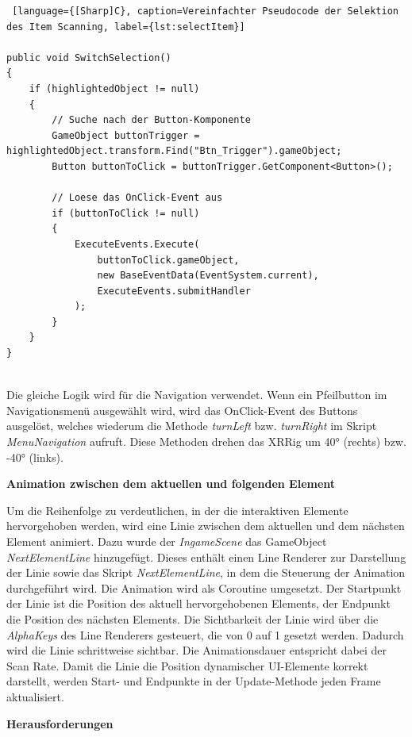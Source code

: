 \begin{lstlisting} [language={[Sharp]C}, caption=Vereinfachter Pseudocode der Selektion des Item Scanning, label={lst:selectItem}]

public void SwitchSelection()
{
    if (highlightedObject != null)
    {
        // Suche nach der Button-Komponente
        GameObject buttonTrigger = highlightedObject.transform.Find("Btn_Trigger").gameObject;
        Button buttonToClick = buttonTrigger.GetComponent<Button>();

        // Loese das OnClick-Event aus
        if (buttonToClick != null)
        {
            ExecuteEvents.Execute(
                buttonToClick.gameObject,
                new BaseEventData(EventSystem.current),
                ExecuteEvents.submitHandler
            );
        }
    }
}
    
\end{lstlisting}

Die gleiche Logik wird für die Navigation verwendet. Wenn ein Pfeilbutton im Navigationsmenü ausgewählt wird, wird das OnClick-Event des Buttons ausgelöst, welches wiederum die Methode \textit{turnLeft} bzw. \textit{turnRight} im Skript \textit{MenuNavigation} aufruft. Diese Methoden drehen das XRRig um 40° (rechts) bzw. -40° (links).

\textbf{Animation zwischen dem aktuellen und folgenden Element}

Um die Reihenfolge zu verdeutlichen, in der die interaktiven Elemente hervorgehoben werden, wird eine Linie zwischen dem aktuellen und dem nächsten Element animiert. Dazu wurde der \textit{IngameScene} das GameObject \textit{NextElementLine} hinzugefügt. Dieses enthält einen Line Renderer zur Darstellung der Linie sowie das Skript \textit{NextElementLine}, in dem die Steuerung der Animation durchgeführt wird.
Die Animation wird als Coroutine umgesetzt. Der Startpunkt der Linie ist die Position des aktuell hervorgehobenen Elements, der Endpunkt die Position des nächsten Elements. Die Sichtbarkeit der Linie wird über die \textit{AlphaKeys} des Line Renderers gesteuert, die von 0 auf 1 gesetzt werden. Dadurch wird die Linie schrittweise sichtbar. Die Animationsdauer entspricht dabei der Scan Rate. Damit die Linie die Position dynamischer UI-Elemente korrekt darstellt, werden Start- und Endpunkte in der Update-Methode jeden Frame aktualisiert.

\textbf{Herausforderungen}

